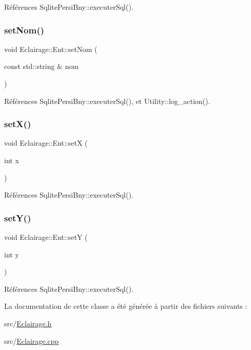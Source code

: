 Références Sqlite\+Persi\+Bny\+::executer\+Sql().

\mbox{\label{classEclairage_1_1Ent_a348836d7b3c2f69f376d63c84ace8e3e}} 
\subsubsection{\texorpdfstring{set\+Nom()}{setNom()}}
{\footnotesize\ttfamily void Eclairage\+::\+Ent\+::set\+Nom (\begin{DoxyParamCaption}\item[{const std\+::string \&}]{nom }\end{DoxyParamCaption})\hspace{0.3cm}{\ttfamily [virtual]}}



Références Sqlite\+Persi\+Bny\+::executer\+Sql(), et Utility\+::log\+\_\+action().

\mbox{\label{classEclairage_1_1Ent_a4c5528c086dee2b6c5433c6e103f7eeb}} 
\subsubsection{\texorpdfstring{set\+X()}{setX()}}
{\footnotesize\ttfamily void Eclairage\+::\+Ent\+::setX (\begin{DoxyParamCaption}\item[{int}]{x }\end{DoxyParamCaption})\hspace{0.3cm}{\ttfamily [virtual]}}



Références Sqlite\+Persi\+Bny\+::executer\+Sql().

\mbox{\label{classEclairage_1_1Ent_abdf5e31d5b5788c832b964c3712b7231}} 
\subsubsection{\texorpdfstring{set\+Y()}{setY()}}
{\footnotesize\ttfamily void Eclairage\+::\+Ent\+::setY (\begin{DoxyParamCaption}\item[{int}]{y }\end{DoxyParamCaption})\hspace{0.3cm}{\ttfamily [virtual]}}



Références Sqlite\+Persi\+Bny\+::executer\+Sql().



La documentation de cette classe a été générée à partir des fichiers suivants \+:\begin{DoxyCompactItemize}
\item 
src/\hyperlink{Eclairage_8h}{Eclairage.\+h}\item 
src/\hyperlink{Eclairage_8cpp}{Eclairage.\+cpp}\end{DoxyCompactItemize}
